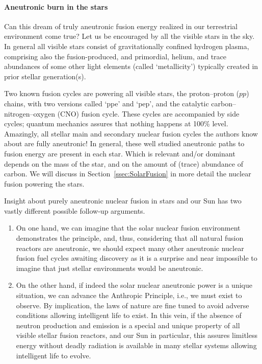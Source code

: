 \documentclass[particles,article,accept,pdftex,moreauthors]{Definitions/mdpi}
\begin{document}
\paragraph*{\bf Aneutronic burn in the stars}
Can this dream of truly aneutronic fusion energy realized in our terrestrial environment come true? Let us be encouraged by all the visible stars in the sky. In general all visible stars consist of gravitationally confined hydrogen plasma, comprising also the fusion-produced, and primordial, helium, and trace abundances of some other light elements (called `metallicity') typically created in prior stellar generation(s). 

Two known fusion cycles are powering all visible stars, the proton--proton ($pp$) chains, with two versions called `ppe' and `pep', and the catalytic carbon--nitrogen--oxygen (CNO) fusion cycle. These cycles are accompanied by side cycles; quantum mechanics assures that nothing happens at 100\% level. Amazingly, all stellar main and secondary nuclear fusion cycles the authors know about are fully aneutronic! In general, these well studied aneutronic paths to fusion energy are present in each star. Which is relevant and/or dominant depends on the mass of the star, and on the amount of (trace) abundance of carbon. We will discuss in Section~\ref{ssec:SolarFusion} in more detail the nuclear fusion powering the stars.

Insight about purely aneutronic nuclear fusion in stars and our Sun has two vastly different possible follow-up arguments.
\begin{enumerate}
\item On one hand, we can imagine that the solar nuclear fusion environment demonstrates the principle, and, thus, considering that all natural fusion reactors are aneutronic, we should expect many other aneutronic nuclear fusion fuel cycles awaiting discovery as it is a surprise and near impossible to imagine that just stellar environments would be aneutronic.
\item On the other hand, if indeed the solar nuclear aneutronic power is a unique situation, we can advance the Anthropic Principle, i.e., we must exist to observe. By implication, the laws of nature are fine tuned to avoid adverse conditions allowing intelligent life to exist. In this vein, if the absence of neutron production and emission is a special and unique property of all visible stellar fusion reactors, and our Sun in particular, this assures limitless energy without deadly radiation is available in many stellar systems allowing intelligent life to evolve.
\end{enumerate}
\end{document}
